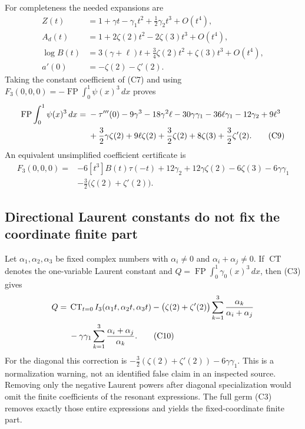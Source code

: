 \documentclass[11pt,letterpaper]{article}
\numberwithin{equation}{section}
\theoremstyle{definition}
\theoremstyle{remark}
\begin{document}
For completeness the needed expansions are
\begin{align*}
 Z(t)&=1+\gamma t-\gamma_1t^2+\tfrac12\gamma_2t^3+O(t^4),\\
 A_d(t)&=1+2\zeta(2)t^2-2\zeta(3)t^3+O(t^4),\\
 \log B(t)&=3(\gamma+\ell)t+\tfrac34\zeta(2)t^2
                 +\zeta(3)t^3+O(t^4),\\
 a'(0)&=-\zeta(2)-\zeta'(2).
\end{align*}
Taking the constant coefficient of (C7) and using
$F_3(0,0,0)=-\operatorname{FP}\int_0^1\psi(x)^3\,dx$ proves
\begin{align}
 \operatorname{FP}\int_0^1\psi(x)^3\,dx={}&-\tau'''(0)
 -9\gamma^3-18\gamma^2\ell-30\gamma\gamma_1
 -36\ell\gamma_1-12\gamma_2+9\ell^3\notag\\
 &+\frac32\gamma\zeta(2)+9\ell\zeta(2)
 +\frac32\zeta(2)+8\zeta(3)+\frac32\zeta'(2). \tag{C9}\label{cub:C9}
\end{align}
An equivalent unsimplified coefficient certificate is
\begin{align*}
 F_3(0,0,0)={}&-6[t^3]B(t)\tau(-t)
 +12\gamma_2+12\gamma\zeta(2)-6\zeta(3)-6\gamma\gamma_1\\
 &-\tfrac32\bigl(\zeta(2)+\zeta'(2)\bigr).
\end{align*}

\subsection{Directional Laurent constants do not fix the coordinate finite part}

Let $\alpha_1,\alpha_2,\alpha_3$ be fixed complex numbers with
$\alpha_i\ne0$ and $\alpha_i+\alpha_j\ne0$. If $\operatorname{CT}$
denotes the one-variable Laurent constant and
$Q=\operatorname{FP}\int_0^1\gamma_0(x)^3\,dx$, then (C3) gives
\begin{align}
 Q={}&\operatorname{CT}_{t=0} I_3(\alpha_1t,\alpha_2t,\alpha_3t)
 -\bigl(\zeta(2)+\zeta'(2)\bigr)
       \sum_{k=1}^3\frac{\alpha_k}{\alpha_i+\alpha_j}\notag\\
 &-\gamma\gamma_1\sum_{k=1}^3\frac{\alpha_i+\alpha_j}{\alpha_k}.
                                                        \tag{C10}\label{cub:C10}
\end{align}
For the diagonal this correction is
$-\frac32(\zeta(2)+\zeta'(2))-6\gamma\gamma_1$.
This is a normalization warning, not an identified false claim in an
inspected source. Removing only the negative Laurent powers after
diagonal specialization would omit the finite coefficients of the
resonant expressions. The full germ (C3) removes exactly those entire
expressions and yields the fixed-coordinate finite part.
\end{document}
